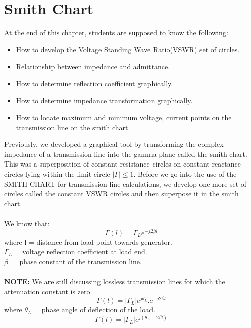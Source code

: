 	\chapter{Smith Chart}
		\begin{center}
		At the end of this chapter, students are supposed to know the following:
		\end{center}
    
	\begin{itemize}
		\item How to develop the Voltage Standing Wave Ratio(VSWR) set of circles.
		\item Relationship between impedance and admittance.
		\item How to determine reflection coefficient graphically.
		\item How to determine impedance transformation graphically.
		\item How to locate maximum and minimum voltage, current points on the transmission line on the smith chart.
	\end{itemize}
	Previously, we developed a graphical tool by transforming the complex impedance of a transmission line into the gamma plane called the smith chart. This was a superposition of constant resistance circles on constant reactance circles lying within the limit circle $|\Gamma| \leq 1$. Before we go into the use of the SMITH CHART for transmission line calculations, we develop one more set of circles called the constant VSWR circles and then superpose it in the smith chart.\\\\ We know that:
	\begin{equation*}
	 \Gamma(l) =\Gamma_L e^{-j2\beta{l}}
	\end{equation*}
	where l = distance from load point towards generator.\\
	$\Gamma_{L}$ = voltage reflection coefficient at load end.\\ 	
	$\beta$\ = phase constant of the transmission line.\\\\
	\textbf{NOTE:}	We are still discussing lossless transmission lines for which the attenuation constant is zero.
	\begin{equation*}
	\Gamma{(l)}=|\Gamma_{L}|e^{j\theta_L}.e^{-j2\beta l}
	\end{equation*}
  where	$\theta_L$ = phase angle of deflection of the load.
\begin{equation}
	\Gamma{(l)} =|\Gamma_L|e^{j(\theta_L - 2\beta{l})}
\end{equation}
